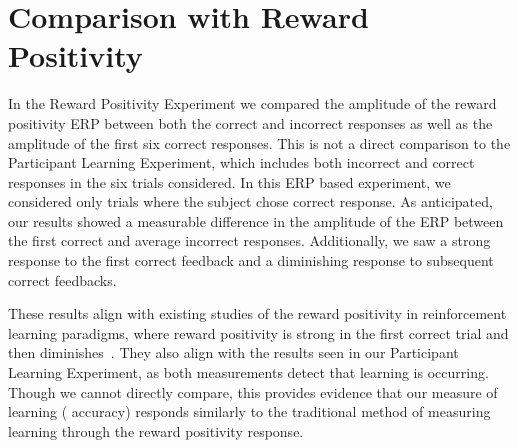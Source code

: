 \section{Comparison with Reward Positivity}
In the Reward Positivity Experiment we compared the amplitude of the reward 
positivity ERP between both the correct and incorrect responses as well as the 
amplitude of the first six correct responses. This is not a direct comparison 
to the Participant Learning Experiment, which includes both incorrect and 
correct responses in the six trials considered. In this ERP based experiment, 
we considered only trials where the subject chose correct response.  As 
anticipated, our results showed a measurable difference in the amplitude of the 
ERP between the first correct and average incorrect responses. Additionally, we 
saw a strong response to the first correct feedback and a diminishing response 
to subsequent correct feedbacks.

These results align with existing studies of the reward positivity in 
reinforcement learning paradigms, where reward positivity is strong in the 
first correct trial and then 
diminishes~\cite{krigolson2014we,krigolson2009learning,bellebaum2014feedback}. 
They also align with the results seen in our Participant Learning Experiment, 
as both measurements detect that learning is occurring. Though we cannot 
directly compare, this provides evidence that our measure of learning (\tvt 
accuracy) responds similarly to the traditional method of measuring learning 
through the reward positivity response.
